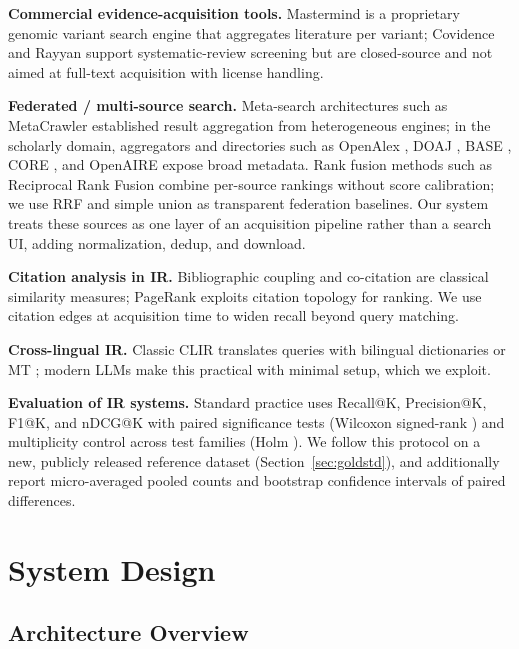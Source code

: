 \documentclass[sigconf,screen]{acmart}
\begin{document}
\textbf{Commercial evidence-acquisition tools.} Mastermind
\cite{mastermind} is a proprietary genomic variant search engine that
aggregates literature per variant; Covidence \cite{covidence} and Rayyan
\cite{ouzzani2016rayyan} support systematic-review screening but are
closed-source and not aimed at full-text acquisition with license handling.

\textbf{Federated / multi-source search.} Meta-search architectures such as
MetaCrawler \cite{selberg1997metacrawler} established result aggregation
from heterogeneous engines; in the scholarly domain, aggregators and
directories such as
OpenAlex \cite{priem2022openalex}, DOAJ \cite{doaj}, BASE \cite{base},
CORE \cite{core}, and OpenAIRE \cite{openaire} expose broad
metadata. Rank fusion methods such as Reciprocal Rank Fusion
\cite{cormack2009reciprocal} combine per-source rankings without score
calibration; we use RRF and simple union as transparent federation
baselines. Our system treats these sources as one layer of an acquisition
pipeline rather than a search UI, adding normalization, dedup, and download.

\textbf{Citation analysis in IR.} Bibliographic coupling
\cite{kessler1963bibliographic} and co-citation \cite{small1973co} are
classical similarity measures; PageRank \cite{page1999pagerank} exploits
citation topology for ranking. We use citation edges at acquisition time
to widen recall beyond query matching.

\textbf{Cross-lingual IR.} Classic CLIR translates queries with
bilingual dictionaries or MT \cite{kishida2005technical}; modern LLMs
\cite{brown2020language,kojima2022large} make this practical with minimal
setup, which we exploit.

\textbf{Evaluation of IR systems.} Standard practice uses Recall@K,
Precision@K, F1@K, and nDCG@K \cite{jarvelin2002cumulated} with paired
significance tests (Wilcoxon signed-rank \cite{wilcoxon1945individual})
and multiplicity control across test families (Holm \cite{holm1979simple}).
We follow this protocol on a new, publicly released reference dataset
(Section~\ref{sec:goldstd}), and additionally report micro-averaged pooled
counts and bootstrap confidence intervals of paired differences.

\section{System Design}
\label{sec:design}

\subsection{Architecture Overview}
\label{sec:architecture}
\end{document}
